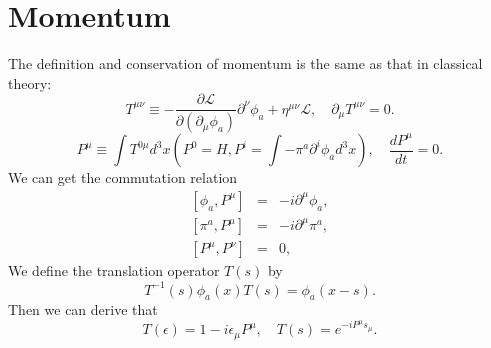 \section{Momentum}
\noindent
The definition and conservation of momentum is the same as that in classical theory:
\[T^{\mu \nu} \equiv -\frac{\partial \mathcal{L}}{\partial(\partial_{\mu}\phi_a)} \partial^{\nu} \phi_a + \eta^{\mu \nu} \mathcal{L} , \quad \partial_{\mu} T^{\mu \nu} = 0.\]
\[P^{\mu} \equiv \int T^{0 \mu} d^3 x \left(P^{0} = H, P^{i} = \int -\pi^a \partial^i \phi_a d^3 x \right), \quad \frac{d P^{\mu}}{dt} = 0. \]
We can get the commutation relation
\begin{eqnarray}
\left[\phi_a,P^{\mu}\right] &=& -i\partial^{\mu} \phi_a, \nonumber \\
\left[\pi^a,P^{\mu}\right] &=& -i\partial^{\mu} \pi^a, \nonumber \\
\left[P^{\mu},P^{\nu}\right] &=& 0 ,\nonumber 
\end{eqnarray}
We define the translation operator $T(s)$ by
\[T^{-1}(s) \phi_a(x) T(s) = \phi_a(x-s).\]
Then we can derive that
\[T(\epsilon) = 1 - i\epsilon_{\mu} P^{\mu} , \quad T(s) = e^{-iP^{\mu}s_{\mu}}.\]

